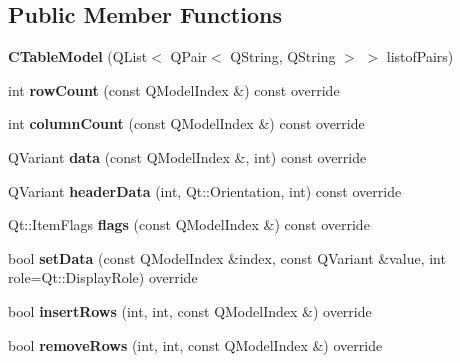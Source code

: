 \subsection*{Public Member Functions}
\begin{DoxyCompactItemize}
\item 
\mbox{\label{classCTableModel_a90a4f47b3deee17620f563b55843e60e}} 
{\bfseries C\+Table\+Model} (Q\+List$<$ Q\+Pair$<$ Q\+String, Q\+String $>$ $>$ listof\+Pairs)
\item 
\mbox{\label{classCTableModel_a85d37c586d1b743440c0c0e99ae6c215}} 
int {\bfseries row\+Count} (const Q\+Model\+Index \&) const override
\item 
\mbox{\label{classCTableModel_a629a47650d025231a67c3fef84438566}} 
int {\bfseries column\+Count} (const Q\+Model\+Index \&) const override
\item 
\mbox{\label{classCTableModel_aecff04e7d37b8ae70dc996a2c08d4a6e}} 
Q\+Variant {\bfseries data} (const Q\+Model\+Index \&, int) const override
\item 
\mbox{\label{classCTableModel_a46ad1777009cf78da7d11ee36f0ede8c}} 
Q\+Variant {\bfseries header\+Data} (int, Qt\+::\+Orientation, int) const override
\item 
\mbox{\label{classCTableModel_ac53d179b21f93b0abb90d1e7499850bd}} 
Qt\+::\+Item\+Flags {\bfseries flags} (const Q\+Model\+Index \&) const override
\item 
\mbox{\label{classCTableModel_ae6ebb2626b4094f05ea9f1fe60e56a98}} 
bool {\bfseries set\+Data} (const Q\+Model\+Index \&index, const Q\+Variant \&value, int role=Qt\+::\+Display\+Role) override
\item 
\mbox{\label{classCTableModel_a3f5bd4bd6da7c0f3d6c310023956f0ce}} 
bool {\bfseries insert\+Rows} (int, int, const Q\+Model\+Index \&) override
\item 
\mbox{\label{classCTableModel_a7fac8a588eb9df36e38e10b91dd8648e}} 
bool {\bfseries remove\+Rows} (int, int, const Q\+Model\+Index \&) override

\end{DoxyCompactItemize}
